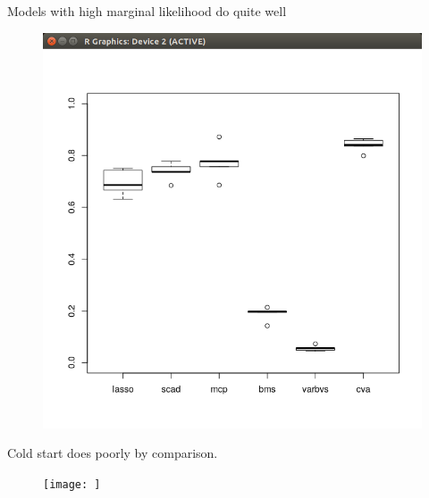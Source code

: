 \documentclass{amsart}[12pt]
\begin{document}
Models with high marginal likelihood do quite well
\begin{figure}
\includegraphics{QLT_warm_start_marginal_likelihood.png}
\end{figure}

Cold start does poorly by comparison.
\begin{figure}
\texttt{[image: ]}
\end{figure}
\end{document}
